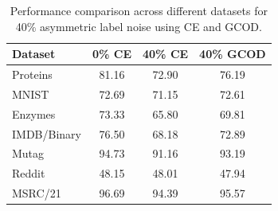 \begin{table}[htbp]
 \caption{Performance comparison across different datasets for 40\% asymmetric label noise using CE and GCOD.}
    \label{tab:asymmetric_noise}
    \centering
    \begin{tabular}{lccc}
        \hline
        \textbf{Dataset} & \textbf{0\% CE} & \textbf{40\% CE} & \textbf{40\% GCOD} \\
        \hline
        Proteins & 81.16 & 72.90 & 76.19 \\
        MNIST    & 72.69 & 71.15 & 72.61 \\
        Enzymes  & 73.33 & 65.80 & 69.81 \\
        IMDB/Binary & 76.50 & 68.18 & 72.89 \\
        Mutag    & 94.73 & 91.16 & 93.19 \\
        Reddit   & 48.15 & 48.01 & 47.94 \\
        MSRC/21  & 96.69 & 94.39 & 95.57 \\
        \hline
    \end{tabular}
\end{table}

